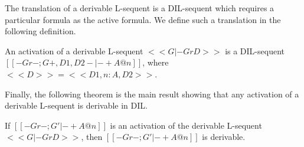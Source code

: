 The translation of a derivable L-sequent is a DIL-sequent which
requires a particular formula as the active formula.  We define
such a translation in the following definition.
\begin{definition}
  \label{def:focusing}
  An activation of a derivable L-sequent $<<G |- Gr D>>$ is a
  DIL-sequent \\ $[[-Gr-;{G}+,{D1,D2}- |- +{A}@n]]$, where 
  $<<D>> = <<D1,n : A,D2>>$.
\end{definition}
Finally, the following theorem is the main result showing that any
activation of a derivable L-sequent is derivable in DIL.
\begin{thm}
  \label{thm:completeness}
  If $[[-Gr- ; G' |- + A @ n]]$ is an activation of the derivable L-sequent 
  $<<G |- Gr D>>$, then $[[-Gr- ; G' |- + A @ n]]$ is derivable.
\end{thm}

